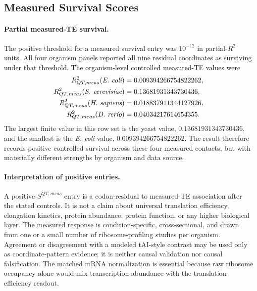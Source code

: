 \subsection{Measured Survival Scores}\label{sec:q6-ribosome-te-survival-scores}

\paragraph{Partial measured-TE survival.}
The positive threshold for a measured survival entry was $10^{-12}$ in partial-$R^2$ units.  All four organism panels reported all nine residual coordinates as surviving under that threshold.  The organism-level controlled measured-TE values were
$$
\begin{aligned}
R^2_{QT,meas}(\emph{E. coli}) &= 0.009394266754822262,\\
R^2_{QT,meas}(\emph{S. cerevisiae}) &= 0.13681931343730436,\\
R^2_{QT,meas}(\emph{H. sapiens}) &= 0.018837911344127926,\\
R^2_{QT,meas}(\emph{D. rerio}) &= 0.04034217614654355.
\end{aligned}
$$
The largest finite value in this row set is the yeast value, $0.13681931343730436$, and the smallest is the \emph{E. coli} value, $0.009394266754822262$.  The result therefore records positive controlled survival across these four measured contacts, but with materially different strengths by organism and data source.

\paragraph{Interpretation of positive entries.}
A positive $S^{QT,meas}$ entry is a codon-residual to measured-TE association after the stated controls.  It is not a claim about universal translation efficiency, elongation kinetics, protein abundance, protein function, or any higher biological layer.  The measured response is condition-specific, cross-sectional, and drawn from one or a small number of ribosome-profiling studies per organism.  Agreement or disagreement with a modeled tAI-style contrast may be used only as coordinate-pattern evidence; it is neither causal validation nor causal falsification.  The matched mRNA normalization is essential because raw ribosome occupancy alone would mix transcription abundance with the translation-efficiency readout.
